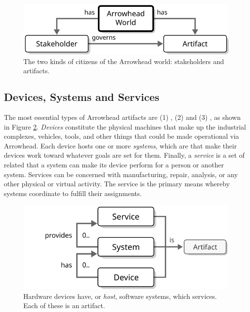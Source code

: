 \vspace*{1mm}

\begin{figure}[ht!]
  \centering
  \includegraphics[scale=0.9]{figures/world}
  \caption{
    The two kinds of citizens of the Arrowhead world: stakeholders and artifacts.
  }
  \label{fig:world}
\end{figure}

\vspace*{-3mm}

\subsection{Devices, Systems and Services}

The most essential types of Arrowhead artifacts are (1) , (2)  and (3) , as shown in Figure \ref{fig:device-system-service}.
\textit{Devices} constitute the physical machines that make up the industrial complexes, vehicles, tools, and other things that could be made operational via Arrowhead.
Each device hosts one or more \textit{systems}, which are   that make their devices work toward whatever goals are set for them.
Finally, a \textit{service} is a set of related  that a system can make its device perform for a person or another system.
Services can be concerned with manufacturing, repair, analysis, or any other physical or virtual activity.
The service is the primary means whereby systems coordinate to fulfill their assignments.

\vspace*{1mm}

\begin{figure}[ht!]
  \centering
  \includegraphics[scale=0.9]{figures/device-system-service}
  \caption{
    Hardware devices have, or \textit{host}, software systems, which  services.
    Each of these is an artifact.
  }
  \label{fig:device-system-service}
\end{figure}

